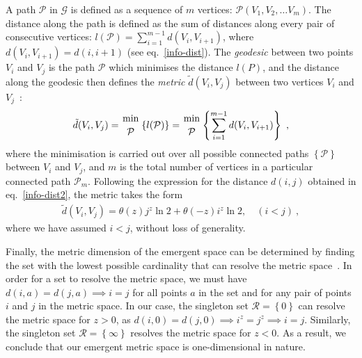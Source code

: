 A path \(\mathcal{P}\) in \(\mathcal{G}\) is defined as a sequence of \(m\) vertices: \(\mathcal{P}(V_{1}, V_{2},\ldots V_{m})\). The distance along the path is defined as the sum of distances along every pair of consecutive vertices: \(l(\mathcal{P}) = \sum_{i=1}^{m-1} d(V_{i}, V_{i+1})\), where \(d(V_i, V_{i+1}) = d(i,i+1)\) (see eq.~\eqref{info-dist}). The {\it geodesic} between two points \(V_i\) and \(V_j\) is the path \(\mathcal{P}\) which minimises the distance \(l(P)\), and the distance along the geodesic then defines the {\it metric} \(\tilde d(V_i, V_j)\) between two vertices \(V_i\) and \(V_j\)~\cite{singharoy2020,cao_2017}:
\begin{equation}\begin{aligned}
	\tilde d(V_i, V_j) = {\text{min}\atop{\mathcal{P}}}\left\{l(\mathcal{P})\right\} = {\text{min}\atop{\mathcal{P}}}\left\{\sum_{i=1}^{m-1} d(V_{i}, V_{i+1})\right\}~,
\end{aligned}\end{equation}
where the minimisation is carried out over all possible connected paths \(\left\{ \mathcal{P} \right\} \) between \(V_i\) and \(V_j\), and \(m\) is the total number of vertices in a particular connected path \(\mathcal{P}_m\).
Following the expression for the distance \(d(i,j)\) obtained in eq.~\eqref{info-dist2}, the metric takes the form
\begin{equation}\begin{aligned}
	\tilde d(V_i, V_j) = \theta(z) j^z \ln 2 + \theta(-z) i^z \ln 2, \quad (i < j)~,
\end{aligned}\end{equation}
where we have assumed \(i < j\), without loss of generality. 

Finally, the metric dimension of the emergent space can be determined by finding the set with the lowest possible cardinality that can resolve the metric space~\cite{cao_2017,Bau2013}. In order for a set to resolve the metric space, we must have \(d(i,a) = d(j,a) \implies i = j\) for all points \(a\) in the set and for any pair of points \(i\) and \(j\) in the metric space. In our case, the singleton set \(\mathcal{R} = \left\{0\right\} \) can resolve the metric space for \(z > 0\), as \(d(i,0) = d(j,0) \implies i^z = j^z \implies i = j\). Similarly, the singleton set \(\mathcal{R} = \left\{\infty \right\} \) resolves the metric space for \(z < 0\). As a result, we conclude that our emergent metric space is one-dimensional in nature.

